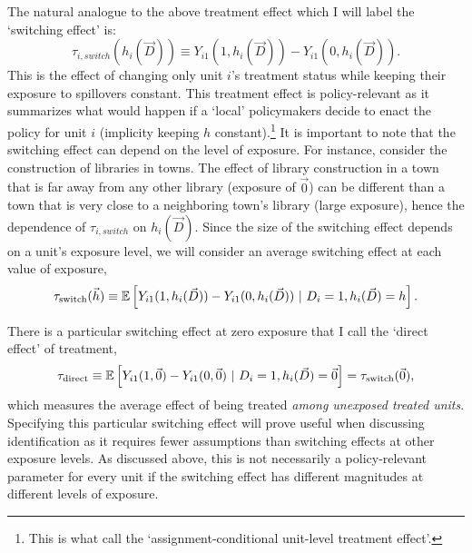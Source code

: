 \documentclass[11pt]{article}
\begin{document}
The natural analogue to the above treatment effect which I will label the `switching effect' is:
\[
    \tau_{i, switch}(h_i(\vec{D})) \equiv Y_{i1}(1, h_i(\vec{D})) - Y_{i1}(0, h_i(\vec{D})).
\] 
This is the effect of changing only unit $i$'s treatment status while keeping their exposure to spillovers constant. This treatment effect is policy-relevant as it summarizes what would happen if a `local' policymakers decide to enact the policy for unit $i$ (implicity keeping $h$ constant).\footnote{This is what \citet{Savje_Aronow_Hudgens_2021} call the `assignment-conditional unit-level treatment effect'.} It is important to note that the switching effect can depend on the level of exposure. For instance, consider the construction of libraries in towns. The effect of library construction in a town that is far away from any other library (exposure of $\vec{0}$) can be different than a town that is very close to a neighboring town's library (large exposure), hence the dependence of $\tau_{i, switch}$ on $h_i(\vec{D})$. Since the size of the switching effect depends on a unit's exposure level, we will consider an average switching effect at each value of exposure, 
\[
    \tau_{\text{switch}}(\vec{h}) \equiv \mathbb{E}\left[Y_{i1}(1, h_i(\vec{D})) - Y_{i1}(0, h_i(\vec{D})) \ \vert \ D_i = 1, h_i(\vec{D}) = h\right].
\]


There is a particular switching effect at zero exposure that I call the `direct effect' of treatment, 
\[
    \tau_{\text{direct}} \equiv \mathbb{E}\left[Y_{i1}(1, \vec{0}) - Y_{i1}(0, \vec{0}) \ \vert \ D_i = 1, h_i(\vec{D}) = \vec{0}\right] = \tau_{\text{switch}}(\vec{0}),
\] 
which measures the average effect of being treated \emph{among unexposed treated units}. Specifying this particular switching effect will prove useful when discussing identification as it requires fewer assumptions than switching effects at other exposure levels. As discussed above, this is not necessarily a policy-relevant parameter for every unit if the switching effect has different magnitudes at different levels of exposure. 
\end{document}
